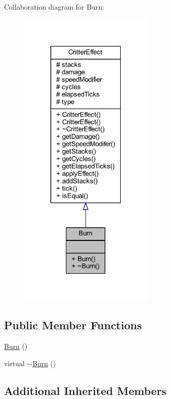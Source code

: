 Collaboration diagram for Burn\+:\nopagebreak
\begin{figure}[H]
\begin{center}
\leavevmode
\includegraphics[width=184pt]{struct_burn__coll__graph}
\end{center}
\end{figure}
\subsection*{Public Member Functions}
\begin{DoxyCompactItemize}
\item 
\hyperlink{struct_burn_acc5865b4cf477642e883e3132dea63c1}{Burn} ()
\item 
virtual \hyperlink{struct_burn_a32fb25058e7d58dd93ccd8e096374662}{$\sim$\+Burn} ()
\end{DoxyCompactItemize}
\subsection*{Additional Inherited Members}


